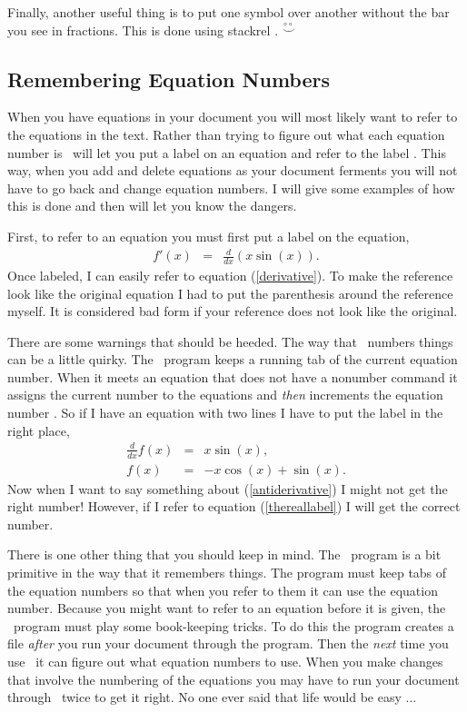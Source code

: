 Finally, another useful thing is to put one symbol
over another without the bar you see in fractions.
This is done using stackrel \cite{The-Manual}. 
$\stackrel{\circ \circ}{\smile}$

\subsection{Remembering Equation Numbers}
When you have equations in your document you will most likely want to
refer to the equations in the text.  Rather than trying to figure out
what each equation number is \lat\ will let you put a label on an
equation and refer to the label \cite{The-Manual}.  This way, when you
add and delete equations as your document ferments you will not have
to go back and change equation numbers.  I will give some examples of
how this is done and then will let you know the dangers.

First, to refer to an equation you must first put a label on the
equation,
\begin{eqnarray}
\label{derivative}
f'(x) & = & \frac{d}{dx} \left( x \sin(x) \right).
\end{eqnarray}
Once labeled, I can easily refer to equation (\ref{derivative}).
To make the reference look like the original equation I had
to put the parenthesis around the reference myself.  It is
considered bad form if your reference does not look like the
original.  

There are some warnings that should be heeded.  The way that \lat\
numbers things can be a little quirky.  The \lat\ program keeps a
running tab of the current equation number.  When it meets an
equation that does not have a nonumber command it assigns the current
number to the equations and {\em then} increments the equation number
\cite{The-Manual}.  So if I have an equation with two lines I have to put
the label in the right place,
\begin{eqnarray}
\label{thereallabel}
\frac{d}{dx} f(x) & = &  x \sin(x), \\
f(x)  & = & -x \cos(x) + \sin(x).
\label{antiderivative}
\nonumber
\end{eqnarray}
Now when I want to say something about (\ref{antiderivative})
I might not get the right number! However, if I refer to
equation (\ref{thereallabel}) I will get the correct number.

There is one other thing that you should keep in mind.  The \lat\
program is a bit primitive in the way that it remembers things.  The
program must keep tabs of the equation numbers so that when you refer
to them it can use the equation number.  Because you might want to
refer to an equation before it is given, the \lat\ program must play
some book-keeping tricks.  To do this the program creates a file {\em
after} you run your document through the program.  Then the {\em next}
time you use \lat\ it can figure out what equation numbers to use.
When you make changes that involve the numbering of the equations you
may have to run your document through \lat\ twice to get it right.  No
one ever said that life would be easy $\ldots$
